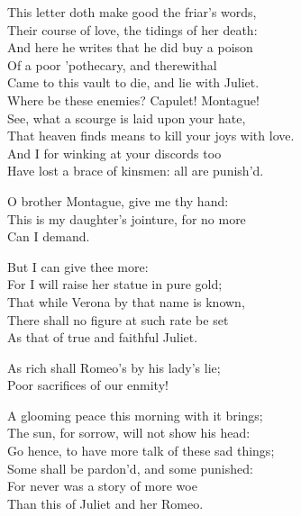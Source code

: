 \begin{speech}
This letter doth make good the friar's words, \\

Their course of love, the tidings of her death: \\
And here he writes that he did buy a poison \\
Of a poor 'pothecary, and therewithal \\
Came to this vault to die, and lie with Juliet. \\
Where be these enemies?   Capulet!   Montague! \\
See, what a scourge is laid upon your hate, \\
That heaven finds means to kill your joys with love. \\
And I for winking at your discords too \\
Have lost a brace of kinsmen: all are punish'd. \\
\end{speech}
\begin{speech}
O brother Montague, give me thy hand: \\
This is my daughter's jointure, for no more \\
Can I demand. \\
\end{speech}
\begin{speech}
But I can give thee more: \\
For I will raise her statue in pure gold; \\
That while Verona by that name is known, \\
There shall no figure at such rate be set \\
As that of true and faithful Juliet. \\
\end{speech}
\begin{speech}
As rich shall Romeo's by his lady's lie; \\
Poor sacrifices of our enmity! \\
\end{speech}
\begin{speech}
A glooming peace this morning with it brings; \\

The sun, for sorrow, will not show   his head: \\
Go hence, to have more talk of these sad things; \\
Some shall be pardon'd, and some punished: \\
For never was a story of more woe \\
Than this of Juliet and her Romeo.  \\
\end{speech}

